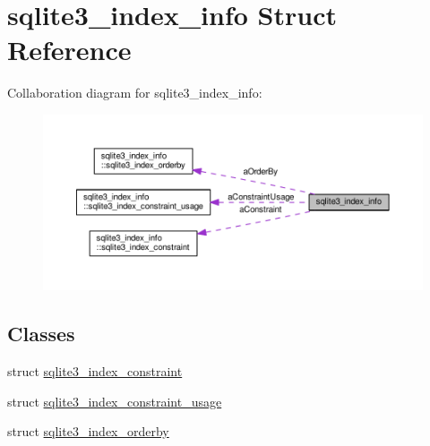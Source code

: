 \hypertarget{structsqlite3__index__info}{}\section{sqlite3\+\_\+index\+\_\+info Struct Reference}
\label{structsqlite3__index__info}


Collaboration diagram for sqlite3\+\_\+index\+\_\+info\+:\nopagebreak
\begin{figure}[H]
\begin{center}
\leavevmode
\includegraphics[width=350pt]{structsqlite3__index__info__coll__graph}
\end{center}
\end{figure}
\subsection*{Classes}
\begin{DoxyCompactItemize}
\item 
struct \hyperlink{structsqlite3__index__info_1_1sqlite3__index__constraint}{sqlite3\+\_\+index\+\_\+constraint}
\item 
struct \hyperlink{structsqlite3__index__info_1_1sqlite3__index__constraint__usage}{sqlite3\+\_\+index\+\_\+constraint\+\_\+usage}
\item 
struct \hyperlink{structsqlite3__index__info_1_1sqlite3__index__orderby}{sqlite3\+\_\+index\+\_\+orderby}
\end{DoxyCompactItemize}
